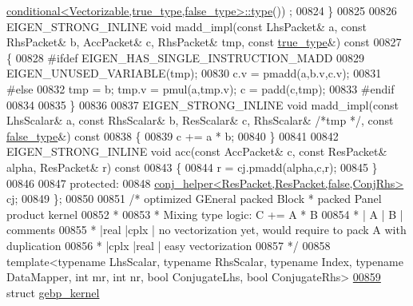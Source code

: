 \begin{DoxyCode}
      \hyperlink{class_eigen_1_1internal_1_1_tensor_lazy_evaluator_writable}{conditional<Vectorizable,true\_type,false\_type>::type}())
      ;
00824   \}
00825 
00826   EIGEN\_STRONG\_INLINE \textcolor{keywordtype}{void} madd\_impl(\textcolor{keyword}{const} LhsPacket& a, \textcolor{keyword}{const} RhsPacket& b, AccPacket& c, RhsPacket& tmp, \textcolor{keyword}{
      const} \hyperlink{struct_eigen_1_1internal_1_1true__type}{true\_type}&)\textcolor{keyword}{ const}
00827 \textcolor{keyword}{  }\{
00828 \textcolor{preprocessor}{#ifdef EIGEN\_HAS\_SINGLE\_INSTRUCTION\_MADD}
00829     EIGEN\_UNUSED\_VARIABLE(tmp);
00830     c.v = pmadd(a,b.v,c.v);
00831 \textcolor{preprocessor}{#else}
00832     tmp = b; tmp.v = pmul(a,tmp.v); c = padd(c,tmp);
00833 \textcolor{preprocessor}{#endif}
00834     
00835   \}
00836 
00837   EIGEN\_STRONG\_INLINE \textcolor{keywordtype}{void} madd\_impl(\textcolor{keyword}{const} LhsScalar& a, \textcolor{keyword}{const} RhsScalar& b, ResScalar& c, RhsScalar& \textcolor{comment}{/*tmp
      */}, \textcolor{keyword}{const} \hyperlink{struct_eigen_1_1internal_1_1false__type}{false\_type}&)\textcolor{keyword}{ const}
00838 \textcolor{keyword}{  }\{
00839     c += a * b;
00840   \}
00841 
00842   EIGEN\_STRONG\_INLINE \textcolor{keywordtype}{void} acc(\textcolor{keyword}{const} AccPacket& c, \textcolor{keyword}{const} ResPacket& alpha, ResPacket& r)\textcolor{keyword}{ const}
00843 \textcolor{keyword}{  }\{
00844     r = cj.pmadd(alpha,c,r);
00845   \}
00846 
00847 \textcolor{keyword}{protected}:
00848   \hyperlink{struct_eigen_1_1internal_1_1conj__helper}{conj\_helper<ResPacket,ResPacket,false,ConjRhs>} cj;
00849 \};
00850 
00851 \textcolor{comment}{/* optimized GEneral packed Block * packed Panel product kernel}
00852 \textcolor{comment}{ *}
00853 \textcolor{comment}{ * Mixing type logic: C += A * B}
00854 \textcolor{comment}{ *  |  A  |  B  | comments}
00855 \textcolor{comment}{ *  |real |cplx | no vectorization yet, would require to pack A with duplication}
00856 \textcolor{comment}{ *  |cplx |real | easy vectorization}
00857 \textcolor{comment}{ */}
00858 \textcolor{keyword}{template}<\textcolor{keyword}{typename} LhsScalar, \textcolor{keyword}{typename} RhsScalar, \textcolor{keyword}{typename} Index, \textcolor{keyword}{typename} DataMapper, \textcolor{keywordtype}{int} mr, \textcolor{keywordtype}{int} nr, \textcolor{keywordtype}{bool} 
      ConjugateLhs, \textcolor{keywordtype}{bool} ConjugateRhs>
\hyperlink{struct_eigen_1_1internal_1_1gebp__kernel}{00859} \textcolor{keyword}{struct }\hyperlink{struct_eigen_1_1internal_1_1gebp__kernel}{gebp\_kernel}

\end{DoxyCode}
